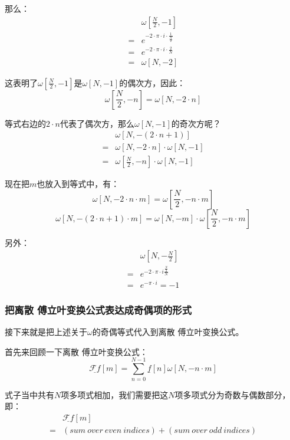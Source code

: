 那么：
\begin{align*}
	  & \omega[\frac{N}{2},-1]                             \\
	= & e^{-2\cdot \pi\cdot  i\cdot \frac{1}{\frac{N}{2}}} \\
	= & e^{-2\cdot \pi\cdot  i\cdot \frac{2}{N}}           \\
	= & \omega[N,-2]
\end{align*}

这表明了$\omega[\frac{N}{2},-1]$是$\omega[N,-1]$的偶次方，因此：
\begin{equation}
	\omega[\frac{N}{2},-n] = \omega[N,-2\cdot n]
\end{equation}

等式右边的$2\cdot n$代表了偶次方，那么$\omega[N,-1]$的奇次方呢？
\begin{align*}
	  & \omega[N,-(2\cdot n+1)]                  \\
	= & \omega[N,-2\cdot n]\cdot \omega[N,-1]    \\
	= & \omega[\frac{N}{2},-n]\cdot \omega[N,-1]
\end{align*}

现在把$m$也放入到等式中，有：
\begin{equation}
	\omega[N,-2\cdot n\cdot m]  = \omega[\frac{N}{2},-n\cdot m]
\end{equation}
\begin{equation}
	\omega[N,-(2\cdot n+1)\cdot m]  = \omega[N,-m]\cdot \omega[\frac{N}{2},-n\cdot m]
\end{equation}

另外：
\begin{align*}
	  & \omega[N,-\frac{N}{2}]                       \\
	= & e^{-2\cdot \pi\cdot  i\frac{\frac{N}{2}}{N}} \\
	= & e^{-\pi\cdot  i} = -1
\end{align*}
\subsubsection{把离散 傅立叶变换公式表达成奇偶项的形式}
接下来就是把上述关于$\omega$的奇偶等式代入到离散 傅立叶变换公式。

首先来回顾一下离散 傅立叶变换公式：
$$
	\underline{\mathcal{F}f}[m] =  \sum_{n=0}^{N-1}\underline{f}[n]\omega[N,-n\cdot m]
$$

式子当中共有$N$项多项式相加，我们需要把这$N$项多项式分为奇数与偶数部分，即：
\begin{align*}
	  & \underline{\mathcal{F}f}[m]                          \\
	= & (sum\ over\ even\ indices)+(sum\ over\ odd\ indices)
\end{align*}

